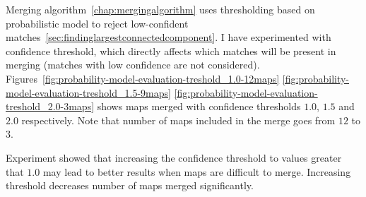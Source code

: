 Merging algorithm~\ref{chap:mergingalgorithm} uses thresholding based on probabilistic model to reject low-confident matches~\ref{sec:findinglargestconnectedcomponent}. I have experimented with confidence threshold, which directly affects which matches will be present in merging (matches with low confidence are not considered). Figures~\ref{fig:probability-model-evaluation-treshold_1.0-12maps} \ref{fig:probability-model-evaluation-treshold_1.5-9maps} \ref{fig:probability-model-evaluation-treshold_2.0-3maps} shows maps merged with confidence thresholds $1.0$, $1.5$ and $2.0$ respectively. Note that number of maps included in the merge goes from $12$ to $3$.

Experiment showed that increasing the confidence threshold to values greater that $1.0$ may lead to better results when maps are difficult to merge. Increasing threshold decreases number of maps merged significantly.

